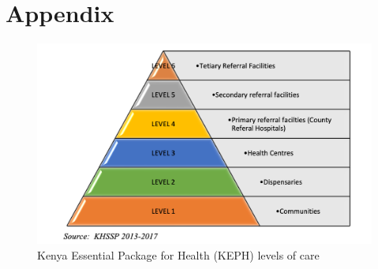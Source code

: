 \documentclass[12pt]{article}
\begin{document}
\section{Appendix}
\begin{figure}[htbp]
\centering
\includegraphics[width=\textwidth]{level of hf.png}
\caption{Kenya Essential Package for Health (KEPH) levels of care}
\label{fig:keph}
\end{figure}
\end{document}
